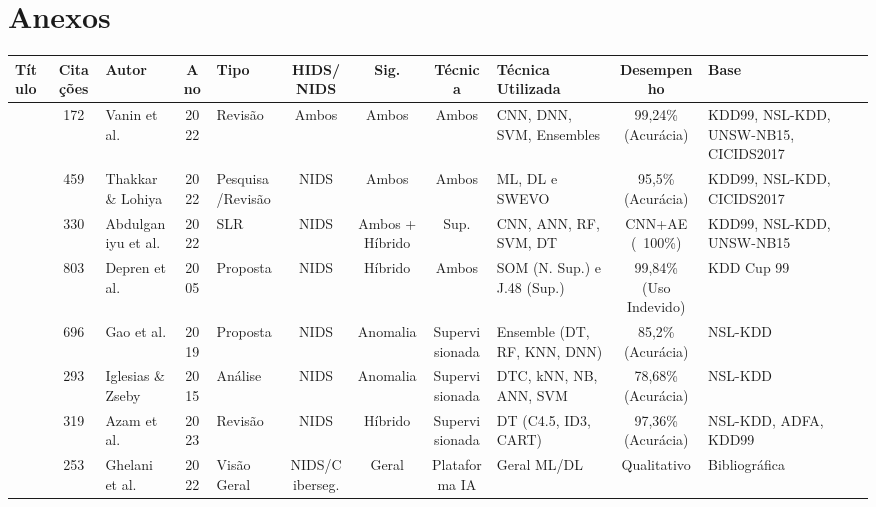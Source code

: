 \documentclass[a4paper,10pt, twocolumn]{article}
\begin{document}
\section{Anexos}
\begin{table}[htbp]
\centering
\fontsize{10}{12}\selectfont
\renewcommand{\arraystretch}{1.2}

\begin{adjustbox}{width=\textwidth}
\begin{tabular}{p{4cm} c p{3cm} c p{3cm} c c c p{4cm} c p{4cm}}
\toprule
Título & Citações & Autor & Ano & Tipo & HIDS/NIDS & Sig. & Técnica & Técnica Utilizada & Desempenho & Base \\
\midrule

\cite{patrick2022study} & 172 & Vanin et al. & 2022 & Revisão & Ambos & Ambos & Ambos & CNN, DNN, SVM, Ensembles & 99,24\% (Acurácia) & KDD99, NSL-KDD, UNSW-NB15, CICIDS2017 \\

\cite{Thakkar2021Survey} & 459 & Thakkar \& Lohiya & 2022 & Pesquisa/Revisão & NIDS & Ambos & Ambos & ML, DL e SWEVO & 95,5\% (Acurácia) & KDD99, NSL-KDD, CICIDS2017 \\

\cite{Abdulganiyu2023Systematic} & 330 & Abdulganiyu et al. & 2022 & SLR & NIDS & Ambos + Híbrido & Sup. & CNN, ANN, RF, SVM, DT & CNN+AE (~100\%) & KDD99, NSL-KDD, UNSW-NB15 \\

\cite{Depren2005Intelligent} & 803 & Depren et al. & 2005 & Proposta & NIDS & Híbrido & Ambos & SOM (N. Sup.) e J.48 (Sup.) & 99,84\% (Uso Indevido) & KDD Cup 99 \\

\cite{Xianwei2019Adaptive} & 696 & Gao et al. & 2019 & Proposta & NIDS & Anomalia & Supervisionada & Ensemble (DT, RF, KNN, DNN) & 85,2\% (Acurácia) & NSL-KDD \\

\cite{felix2014analysis} & 293 & Iglesias \& Zseby & 2015 & Análise & NIDS & Anomalia & Supervisionada & DTC, kNN, NB, ANN, SVM & 78,68\% (Acurácia) & NSL-KDD \\

\cite{zehedi2023comparative} & 319 & Azam et al. & 2023 & Revisão & NIDS & Híbrido & Supervisionada & DT (C4.5, ID3, CART) & 97,36\% (Acurácia) & NSL-KDD, ADFA, KDD99 \\

\cite{diptiben2022cyber} & 253 & Ghelani et al. & 2022 & Visão Geral & NIDS/Ciberseg. & Geral & Plataforma IA & Geral ML/DL & Qualitativo & Bibliográfica \\


\end{tabular}
\end{adjustbox}
\end{table}
\end{document}

